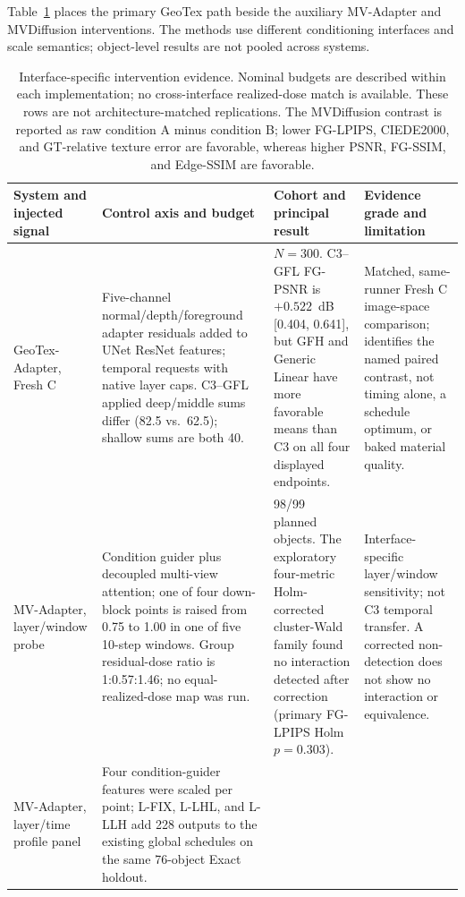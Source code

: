 \documentclass[times,twocolumn,final]{elsarticle}
\providecommand{\DIFadd}[1]{{\protect\color{blue} \sf #1}} %
\providecommand{\DIFaddbegin}{} %
\providecommand{\DIFaddend}{} %
\providecommand{\DIFaddFL}[1]{\DIFadd{#1}} %
\providecommand{\DIFaddbeginFL}{\DIFaddbegin} %
\providecommand{\DIFaddendFL}{\DIFaddend} %
\renewcommand{\DIFaddbeginFL}{}
\renewcommand{\DIFaddendFL}{}
\renewcommand{\DIFaddFL}[1]{#1}
\begin{document}
\DIFadd{Table~\ref{tab:cross-interface} places the primary GeoTex path beside the auxiliary MV-Adapter and MVDiffusion interventions. The methods use different conditioning interfaces and scale semantics; object-level results are not pooled across systems.
}

\begin{table}[t]
\centering
\scriptsize
\setlength{\tabcolsep}{3pt}
\caption{Interface-specific intervention evidence. Nominal budgets are described within each implementation; no cross-interface realized-dose match is available. These rows are not architecture-matched replications. The MVDiffusion contrast is reported as raw condition A minus condition B; lower FG-LPIPS, CIEDE2000, and GT-relative texture error are favorable, whereas higher PSNR, FG-SSIM, and Edge-SSIM are favorable.}
\label{tab:cross-interface}
\begin{tabular}{p{2.4cm}p{4.0cm}p{4.2cm}p{4.5cm}}
\toprule
\DIFaddFL{System and injected signal }& \DIFaddFL{Control axis and budget }& \DIFaddFL{Cohort and principal result }& \DIFaddFL{Evidence grade and limitation }\\
\midrule
\DIFaddFL{GeoTex-Adapter, Fresh C }&
\DIFaddFL{Five-channel normal/depth/foreground adapter residuals added to UNet ResNet features; temporal requests with native layer caps. C3--GFL applied deep/middle sums differ (82.5 vs.\ 62.5); shallow sums are both 40. }&
\DIFaddFL{$N=300$. C3--GFL FG-PSNR is $+0.522$~dB }[\DIFaddFL{0.404}\DIFaddendFL ,   \DIFaddbeginFL \DIFaddFL{0.641}]\DIFaddFL{, but GFH and Generic Linear have more favorable means than C3 on all four displayed endpoints. }&
\DIFaddFL{Matched, same-runner Fresh C image-space comparison; identifies the named paired contrast, not timing alone, a schedule optimum, or baked material quality. }\\
\DIFaddFL{MV-Adapter, layer/window probe }&
\DIFaddFL{Condition guider plus decoupled multi-view attention; one of four down-block points is raised from 0.75 to 1.00 in one of five 10-step windows. Group residual-dose ratio is 1:0.57:1.46; no equal-realized-dose map was run. }&
\DIFaddFL{98/99 planned objects. The exploratory four-metric Holm-corrected cluster-Wald family found no interaction detected after correction (primary FG-LPIPS Holm $p=0.303$). }&
\DIFaddFL{Interface-specific layer/window sensitivity; not C3 temporal transfer. A corrected non-detection does not show no interaction or equivalence. }\\
\DIFaddFL{MV-Adapter, layer/time profile panel }&
\DIFaddFL{Four condition-guider features were scaled per point; L-FIX, L-LHL, and L-LLH add 228 outputs to the existing global schedules on the same 76-object Exact holdout. }&

\end{tabular}
\end{table}
\end{document}
